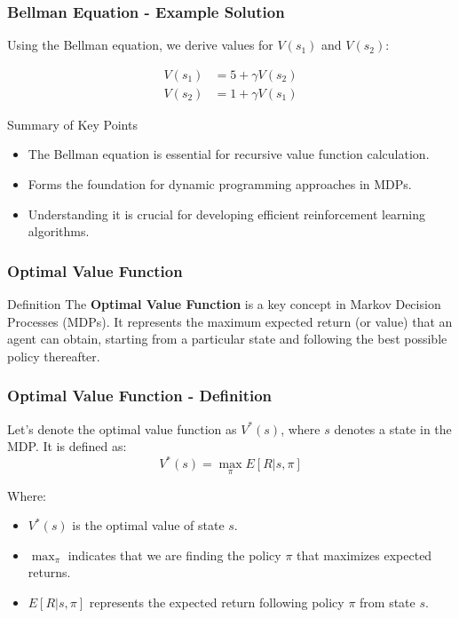 \documentclass[aspectratio=169]{beamer}
\begin{document}
\begin{frame}[fragile]
  \frametitle{Bellman Equation - Example Solution}
  Using the Bellman equation, we derive values for $V(s_1)$ and $V(s_2)$:
  
  \begin{align}
    V(s_1) &= 5 + \gamma V(s_2) \\
    V(s_2) &= 1 + \gamma V(s_1)
  \end{align}
  
  \begin{block}{Summary of Key Points}
    \begin{itemize}
      \item The Bellman equation is essential for recursive value function calculation.
      \item Forms the foundation for dynamic programming approaches in MDPs.
      \item Understanding it is crucial for developing efficient reinforcement learning algorithms.
    \end{itemize}
  \end{block}
\end{frame}

\begin{frame}[fragile]
    \frametitle{Optimal Value Function}
    \begin{block}{Definition}
        The \textbf{Optimal Value Function} is a key concept in Markov Decision Processes (MDPs). It represents the maximum expected return (or value) that an agent can obtain, starting from a particular state and following the best possible policy thereafter.
    \end{block}
\end{frame}

\begin{frame}[fragile]
    \frametitle{Optimal Value Function - Definition}
    Let’s denote the optimal value function as \(V^*(s)\), where \(s\) denotes a state in the MDP. It is defined as:
    \begin{equation}
        V^*(s) = \max_{\pi} E[R | s, \pi]
    \end{equation}
    
    Where:
    \begin{itemize}
        \item \(V^*(s)\) is the optimal value of state \(s\).
        \item \(\max_{\pi}\) indicates that we are finding the policy \(\pi\) that maximizes expected returns.
        \item \(E[R | s, \pi]\) represents the expected return following policy \(\pi\) from state \(s\).
    \end{itemize}
\end{frame}
\end{document}
